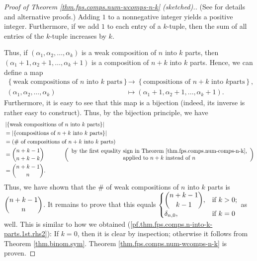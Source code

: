 \begin{proof}
[Proof of Theorem \ref{thm.fps.comps.num-wcomps-n-k} (sketched).](See
\cite[Theorem 2.10.5]{19fco} for details and alternative proofs.) Adding $1$
to a nonnegative integer yields a positive integer. Furthermore, if we add $1$
to each entry of a $k$-tuple, then the sum of all entries of the $k$-tuple
increases by $k$.

Thus, if $\left(  \alpha_{1},\alpha_{2},\ldots,\alpha_{k}\right)  $ is a weak
composition of $n$ into $k$ parts, then \newline$\left(  \alpha_{1}%
+1,\alpha_{2}+1,\ldots,\alpha_{k}+1\right)  $ is a composition of $n+k$ into
$k$ parts. Hence, we can define a map%
\begin{align*}
\left\{  \text{weak compositions of }n\text{ into }k\text{ parts}\right\}   &
\rightarrow\left\{  \text{compositions of }n+k\text{ into }k\text{
parts}\right\}  ,\\
\left(  \alpha_{1},\alpha_{2},\ldots,\alpha_{k}\right)   &  \mapsto\left(
\alpha_{1}+1,\alpha_{2}+1,\ldots,\alpha_{k}+1\right)  .
\end{align*}
Furthermore, it is easy to see that this map is a bijection (indeed, its
inverse is rather easy to construct). Thus, by the bijection principle, we
have%
\begin{align*}
&  \left\vert \left\{  \text{weak compositions of }n\text{ into }k\text{
parts}\right\}  \right\vert \\
&  =\left\vert \left\{  \text{compositions of }n+k\text{ into }k\text{
parts}\right\}  \right\vert \\
&  =\left(  \text{\# of compositions of }n+k\text{ into }k\text{ parts}\right)
\\
&  =\dbinom{n+k-1}{n+k-k}\ \ \ \ \ \ \ \ \ \ \left(
\begin{array}
[c]{c}%
\text{by the first equality sign in Theorem \ref{thm.fps.comps.num-comps-n-k}%
,}\\
\text{applied to }n+k\text{ instead of }n
\end{array}
\right) \\
&  =\dbinom{n+k-1}{n}.
\end{align*}
Thus, we have shown that the \# of weak compositions of $n$ into $k$ parts is
$\dbinom{n+k-1}{n}$. It remains to prove that this equals $%
\begin{cases}
\dbinom{n+k-1}{k-1}, & \text{if }k>0;\\
\delta_{n,0}, & \text{if }k=0
\end{cases}
$ as well. This is similar to how we obtained
(\ref{pf.thm.fps.comps.n-into-k-parts.1st.rhs2}): If $k=0$, then it is clear
by inspection; otherwise it follows from Theorem \ref{thm.binom.sym}. Theorem
\ref{thm.fps.comps.num-wcomps-n-k} is proven.
\end{proof}

